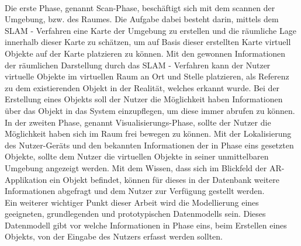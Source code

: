 \\ 
\linebreak
Die erste Phase, genannt Scan-Phase, beschäftigt sich mit dem scannen der Umgebung, bzw. des Raumes. Die Aufgabe dabei besteht darin, 
mittels dem \ac{SLAM} - Verfahren eine Karte der Umgebung zu erstellen und die räumliche Lage innerhalb dieser Karte zu schätzen, um 
auf Basis dieser erstellten Karte virtuell Objekte auf der Karte platzieren zu können. Mit den gewonnen Informationen der räumlichen 
Darstellung durch das \acs{SLAM} - Verfahren kann der Nutzer virtuelle Objekte im virtuellen Raum an Ort und Stelle platzieren, als 
Referenz zu dem existierenden Objekt in der Realität, welches erkannt wurde. Bei der Erstellung eines Objekts soll der Nutzer die 
Möglichkeit haben Informationen über das Objekt in das System einzupflegen, um diese immer abrufen zu können. 
\\ 
\linebreak
In der zweiten Phase, genannt Visualisierungs-Phase, sollte der Nutzer die Möglichkeit haben sich im Raum frei bewegen zu können. 
Mit der Lokalisierung des Nutzer-Geräts und den bekannten Informationen der in Phase eins gesetzten Objekte, sollte dem Nutzer 
die virtuellen Objekte in seiner unmittelbaren Umgebung angezeigt werden. Mit dem Wissen, dass sich im Blickfeld der AR-Applikation 
ein Objekt befindet, können für dieses in der Datenbank weitere Informationen abgefragt und dem Nutzer zur Verfügung gestellt werden.
\\ 
\linebreak
Ein weiterer wichtiger Punkt dieser Arbeit wird die Modellierung eines geeigneten, grundlegenden und prototypischen Datenmodells sein. 
Dieses Datenmodell gibt vor welche Informationen in Phase eins, beim Erstellen eines Objekts, von der Eingabe des Nutzers 
erfasst werden sollten. 


